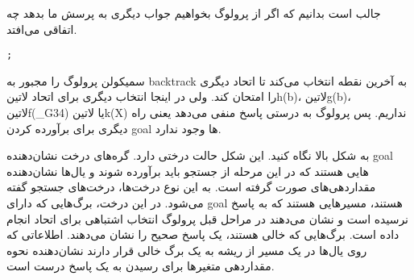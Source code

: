 \begin{latin}
\end{latin}

جالب است بدانیم که اگر از پرولوگ بخواهیم جواب دیگری به پرسش ما بدهد چه اتفاقی می‌افتد.

\begin{latin}
\begin{lstlisting}
;
\end{lstlisting}
\end{latin}

سمیکولن پرولوگ را مجبور به backtrack به آخرین نقطه انتخاب می‌کند تا اتحاد دیگری را امتحان کند. ولی در اینجا انتخاب دیگری برای اتحاد ‌لاتین{h(b)}، ‌لاتین{g(b)}، ‌لاتین{f(\_G34)} یا ‌لاتین{k(X)} نداریم. پس پرولوگ به درستی پاسخ منفی می‌دهد یعنی راه دیگری برای برآورده کردن goal ها وجود ندارد.

به شکل بالا نگاه کنید. این شکل حالت درختی دارد. گره‌های درخت نشان‌دهنده goal هایی هستند که در این مرحله از جستجو باید برآورده شوند و یال‌ها نشان‌دهنده مقداردهی‌های صورت گرفته است. به این نوع درخت‌ها، درخت‌های جستجو گفته می‌شود. در این درخت، برگ‌هایی که دارای goal هستند، مسیرهایی هستند که به پاسخ نرسیده است و نشان می‌دهند در مراحل قبل پرولوگ انتخاب اشتباهی برای اتحاد انجام داده است. برگ‌هایی که خالی هستند، یک پاسخ صحیح را نشان می‌دهند. اطلاعاتی که روی یال‌ها در یک مسیر از ریشه به یک برگ خالی قرار دارند نشان‌دهنده نحوه مقداردهی متغیرها برای رسیدن به یک پاسخ درست است.

\clearpage

